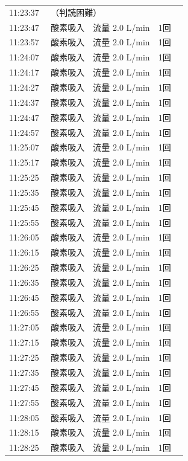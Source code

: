 \documentclass[UTF8,10pt,a4paper,fontset=fandol]{ctexart}
\begin{document}
\noindent
\begin{minipage}[t]{0.48\linewidth}
\scriptsize
\begin{tabular}{@{}p{0.22\linewidth}p{0.72\linewidth}@{}}
11:23:37 & （判読困難）\\
11:23:47 & 酸素吸入　流量 2.0 L/min　1回\\
11:23:57 & 酸素吸入　流量 2.0 L/min　1回\\
11:24:07 & 酸素吸入　流量 2.0 L/min　1回\\
11:24:17 & 酸素吸入　流量 2.0 L/min　1回\\
11:24:27 & 酸素吸入　流量 2.0 L/min　1回\\
11:24:37 & 酸素吸入　流量 2.0 L/min　1回\\
11:24:47 & 酸素吸入　流量 2.0 L/min　1回\\
11:24:57 & 酸素吸入　流量 2.0 L/min　1回\\
11:25:07 & 酸素吸入　流量 2.0 L/min　1回\\
11:25:17 & 酸素吸入　流量 2.0 L/min　1回\\
11:25:25 & 酸素吸入　流量 2.0 L/min　1回\\
11:25:35 & 酸素吸入　流量 2.0 L/min　1回\\
11:25:45 & 酸素吸入　流量 2.0 L/min　1回\\
11:25:55 & 酸素吸入　流量 2.0 L/min　1回\\
11:26:05 & 酸素吸入　流量 2.0 L/min　1回\\
11:26:15 & 酸素吸入　流量 2.0 L/min　1回\\
11:26:25 & 酸素吸入　流量 2.0 L/min　1回\\
11:26:35 & 酸素吸入　流量 2.0 L/min　1回\\
11:26:45 & 酸素吸入　流量 2.0 L/min　1回\\
11:26:55 & 酸素吸入　流量 2.0 L/min　1回\\
11:27:05 & 酸素吸入　流量 2.0 L/min　1回\\
11:27:15 & 酸素吸入　流量 2.0 L/min　1回\\
11:27:25 & 酸素吸入　流量 2.0 L/min　1回\\
11:27:35 & 酸素吸入　流量 2.0 L/min　1回\\
11:27:45 & 酸素吸入　流量 2.0 L/min　1回\\
11:27:55 & 酸素吸入　流量 2.0 L/min　1回\\
11:28:05 & 酸素吸入　流量 2.0 L/min　1回\\
11:28:15 & 酸素吸入　流量 2.0 L/min　1回\\
11:28:25 & 酸素吸入　流量 2.0 L/min　1回\\

\end{tabular}
\end{minipage}
\end{document}
